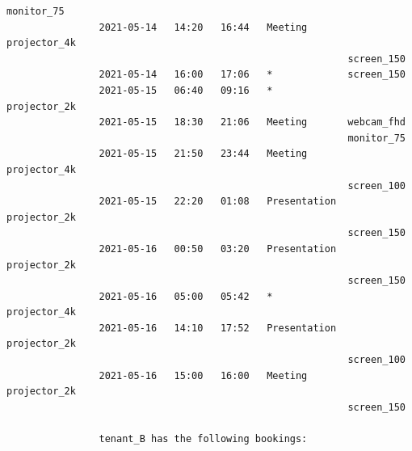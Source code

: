 \documentclass{article}
\begin{document}
\begin{Verbatim}[gobble=8]
                                                           monitor_75
                2021-05-14   14:20   16:44   Meeting       projector_4k
                                                           screen_150
                2021-05-14   16:00   17:06   *             screen_150
                2021-05-15   06:40   09:16   *             projector_2k
                2021-05-15   18:30   21:06   Meeting       webcam_fhd
                                                           monitor_75
                2021-05-15   21:50   23:44   Meeting       projector_4k
                                                           screen_100
                2021-05-15   22:20   01:08   Presentation  projector_2k
                                                           screen_150
                2021-05-16   00:50   03:20   Presentation  projector_2k
                                                           screen_150
                2021-05-16   05:00   05:42   *             projector_4k
                2021-05-16   14:10   17:52   Presentation  projector_2k
                                                           screen_100
                2021-05-16   15:00   16:00   Meeting       projector_2k
                                                           screen_150
                
                tenant_B has the following bookings:
                

\end{Verbatim}
\end{document}
